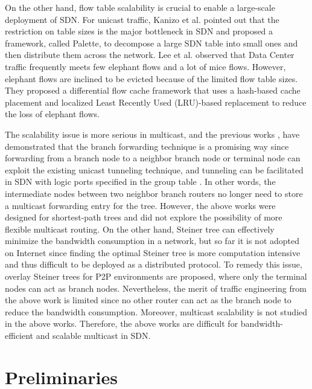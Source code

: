 \documentclass[conference]{IEEEtran}
\begin{document}
On the other hand, flow table scalability is crucial to enable a large-scale
deployment of SDN. For unicast traffic, Kanizo et al. \cite{Kanizo2013} pointed out that
the restriction on table sizes is the major bottleneck in SDN and proposed a
framework, called Palette, to decompose a large SDN table into small ones
and then distribute them across the network. Lee et al. \cite{Lee2013} observed that
Data Center traffic frequently meets few elephant flows and a lot of mice
flows. However, elephant flows are inclined to be evicted because of the
limited flow table sizes. They proposed a differential flow cache framework
that uses a hash-based cache placement and localized Least Recently Used
(LRU)-based replacement to reduce the loss of elephant flows.

The scalability issue is more serious in multicast, and the previous works
\cite{Yang2008}, \cite{YangLiao2008, Tian1998, Stoica2000, Wong2000} have demonstrated that the branch forwarding technique is a promising
way since forwarding from a branch node to a neighbor branch node or terminal node can exploit the
existing unicast tunneling technique, and tunneling can be facilitated in
SDN with logic ports specified in the group table \cite{OpenFlow2013}. In other words, the
intermediate nodes between two neighbor branch routers no longer need to
store a multicast forwarding entry for the tree. However, the above works
were designed for shortest-path trees and did not explore the possibility of more flexible multicast routing. On the other hand, Steiner tree \cite{Takahashi1980} can
effectively minimize the bandwidth consumption in a network, but so far it
is not adopted on Internet since finding the optimal Steiner tree is more
computation intensive and thus difficult to be deployed as a distributed
protocol. To remedy this issue, overlay
Steiner trees \cite{YangL07IPDS, Aharoni1998} for P2P environments are proposed, where only the terminal nodes can
act as branch nodes. Nevertheless, the merit of traffic engineering from the
above work is limited since no other router can act as the branch node to reduce the bandwidth consumption. Moreover,
multicast scalability is not studied in the above works. Therefore, the
above works are difficult for bandwidth-efficient and scalable multicast in
SDN.



\section{Preliminaries}
\end{document}
